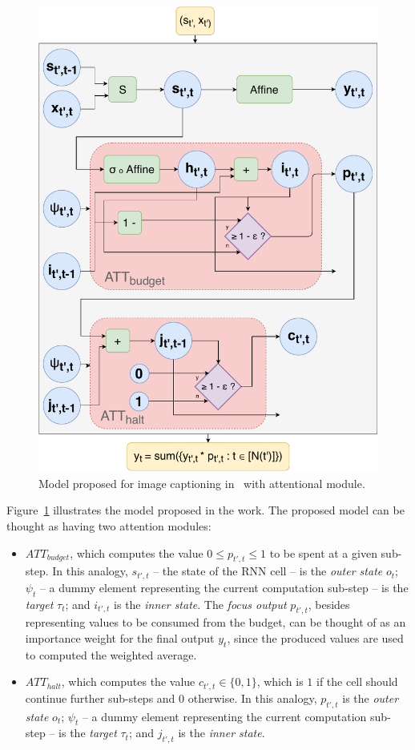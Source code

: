 \documentclass[12pt]{article}
\begin{document}
\begin{figure}[H]
    \centering
    \includegraphics[width=0.6\linewidth]{./img/act.pdf}
    \caption{Model proposed for image captioning in~\cite{ref:act} with attentional module.}
\label{fig:act}
\end{figure}

Figure~\ref{fig:act} illustrates the model proposed in the work.
The proposed model can be thought as having two attention modules:
\begin{itemize}
    \item \textbf{$ATT_{budget}$}, which computes the value $0 \le p_{t',t} \le 1$ to be spent at a given sub-step.
        In this analogy, $s_{t',t}$ -- the state of the RNN cell -- is the \emph{outer state} $o_t$;
        $\psi_t$ -- a dummy element representing the current computation sub-step -- is the \emph{target} $\tau_t$;
        and $i_{t',t}$ is the \emph{inner state}.
        The \emph{focus output} $p_{t',t}$, besides representing values to be consumed from the budget,
        can be thought of as an importance weight for the final output $y_t$, since the produced values are used to computed
        the weighted average.
    \item \textbf{$ATT_{halt}$}, which computes the value $c_{t',t} \in \{0, 1\}$, which is $1$ if the cell should continue
        further sub-steps and $0$ otherwise.
        In this analogy, $p_{t',t}$ is the \emph{outer state} $o_t$;
        $\psi_t$ -- a dummy element representing the current computation sub-step -- is the \emph{target} $\tau_t$;
        and $j_{t',t}$ is the \emph{inner state}.
\end{itemize}
\end{document}
